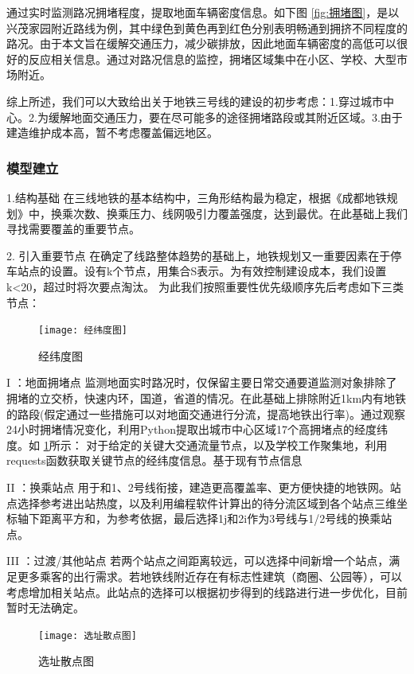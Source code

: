 \documentclass[12pt,a4paper]{mcmthesis}
\begin{document}
通过实时监测路况拥堵程度，提取地面车辆密度信息。如下图 \ref{fig:拥堵图}，是以兴茂家园附近路线为例，其中绿色到黄色再到红色分别表明畅通到拥挤不同程度的路况。由于本文旨在缓解交通压力，减少碳排放，因此地面车辆密度的高低可以很好的反应相关信息。通过对路况信息的监控，拥堵区域集中在小区、学校、大型市场附近。

综上所述，我们可以大致给出关于地铁三号线的建设的初步考虑：1.穿过城市中心。2.为缓解地面交通压力，要在尽可能多的途径拥堵路段或其附近区域。3.由于建造维护成本高，暂不考虑覆盖偏远地区。

\subsubsection{模型建立}
1.结构基础
在三线地铁的基本结构中，三角形结构最为稳定，根据《成都地铁规划》中，换乘次数、换乘压力、线网吸引力覆盖强度，达到最优。在此基础上我们寻找需要覆盖的重要节点。

2.	引入重要节点
在确定了线路整体趋势的基础上，地铁规划又一重要因素在于停车站点的设置。设有k个节点，用集合S表示。为有效控制建设成本，我们设置k<20，超过时将次要点淘汰。
为此我们按照重要性优先级顺序先后考虑如下三类节点：

\begin{figure}[h!t]
	\centerline{\texttt{[image: 经纬度图]}\quad
	}
	\caption{\song\wuhao
		经纬度图}
	\label{fig:经纬度图}
\end{figure}
I ：地面拥堵点
监测地面实时路况时，仅保留主要日常交通要道监测对象排除了拥堵的立交桥，快速内环，国道，省道的情况。在此基础上排除附近1km内有地铁的路段(假定通过一些措施可以对地面交通进行分流，提高地铁出行率)。通过观察24小时拥堵情况变化，利用Python提取出城市中心区域17个高拥堵点的经度纬度。如 \ref{fig:经纬度图}所示：
对于给定的关键大交通流量节点，以及学校工作聚集地，利用requests函数获取关键节点的经纬度信息。基于现有节点信息

II ：换乘站点
用于和1、2号线衔接，建造更高覆盖率、更方便快捷的地铁网。站点选择参考进出站热度，以及利用编程软件计算出的待分流区域到各个站点三维坐标轴下距离平方和，为参考依据，最后选择1j和2i作为3号线与1/2号线的换乘站点。

III ：过渡/其他站点
若两个站点之间距离较远，可以选择中间新增一个站点，满足更多乘客的出行需求。若地铁线附近存在有标志性建筑（商圈、公园等），可以考虑增加相关站点。此站点的选择可以根据初步得到的线路进行进一步优化，目前暂时无法确定。


\begin{figure}[h!t]
	\centerline{\texttt{[image: 选址散点图]}\quad
	}
	\caption{\song\wuhao
		选址散点图}
	\label{fig:选址散点图}
\end{figure}
\end{document}
